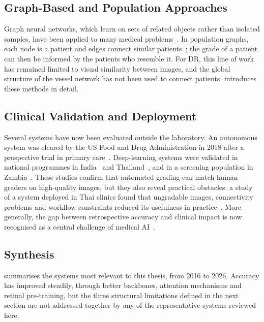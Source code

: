 \subsection{Graph-Based and Population Approaches}

Graph neural networks, which learn on sets of related objects rather than isolated
samples, have been applied to many medical problems~\cite{ahmedt2021graphmed}. In
population graphs, each node is a patient and edges connect similar
patients~\cite{parisot2018disease}; the grade of a patient can then be informed by the
patients who resemble it. For DR, this line of work has remained limited to visual
similarity between images, and the global structure of the vessel network has not been
used to connect patients.  introduces these methods in detail.

\subsection{Clinical Validation and Deployment}

Several systems have now been evaluated outside the laboratory. An autonomous system was
cleared by the US Food and Drug Administration in 2018 after a prospective trial in primary
care~\cite{abramoff2018pivotal}. Deep-learning systems were validated in national
programmes in India~\cite{gulshan2019india} and Thailand~\cite{ruamviboonsuk2019thailand},
and in a screening population in Zambia~\cite{bellemo2019zambia}. These studies confirm
that automated grading can match human graders on high-quality images, but they also
reveal practical obstacles: a study of a system deployed in Thai clinics found that
ungradable images, connectivity problems and workflow constraints reduced its usefulness
in practice~\cite{beede2020human}. More generally, the gap between retrospective accuracy
and clinical impact is now recognised as a central challenge of medical
AI~\cite{kelly2019challenges,liu2019comparison,rajpurkar2022ai}.

\subsection{Synthesis}

 summarises the systems most relevant to this thesis, from 2016 to 2026.
Accuracy has improved steadily, through better backbones, attention mechanisms and
retinal pre-training, but the three structural limitations defined in the next section
are not addressed together by any of the representative systems reviewed here.

